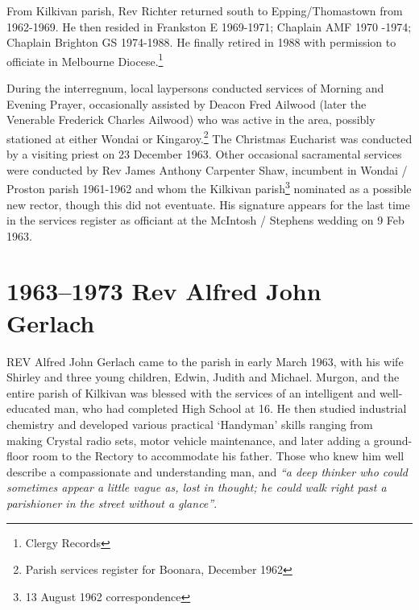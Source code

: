 From Kilkivan parish, Rev Richter returned south to Epping/Thomastown from 1962-1969. He then resided in Frankston E 1969-1971; Chaplain AMF 1970 -1974; Chaplain Brighton GS 1974-1988. He finally retired in 1988 with permission to officiate in Melbourne Diocese.\footnote{Clergy Records}


During the interregnum, local laypersons conducted services of Morning and Evening Prayer, occasionally assisted by Deacon Fred Ailwood (later the Venerable Frederick Charles Ailwood) who was active in the area, possibly stationed at either Wondai or Kingaroy.\footnote{Parish services register for Boonara, December 1962} The Christmas Eucharist was conducted by a visiting priest on 23 December 1963. Other occasional sacramental services were conducted by Rev James Anthony Carpenter Shaw, incumbent in Wondai / Proston parish 1961-1962 and whom the Kilkivan parish\footnote{13 August 1962 correspondence} nominated as a possible new rector, though this did not eventuate. His signature appears for the last time in the services register as officiant at the McIntosh / Stephens wedding on 9 Feb 1963.


\balance


\printendnotes[custom]
\setcounter{endnote}{0}




\chapter{1963--1973 Rev Alfred John Gerlach}
\nobalance


\lettrine[lines=3]{R}{EV}
 Alfred John Gerlach came to the parish in early March 1963, with his wife Shirley and three young children, Edwin, Judith and Michael. Murgon, and the entire parish of Kilkivan was blessed with the services of an intelligent and well-educated man, who had completed High School at 16. He then studied industrial chemistry and developed various practical `Handyman' skills ranging from making Crystal radio sets, motor vehicle maintenance, and later adding a ground-floor room to the Rectory to accommodate his father. Those who knew him well describe a compassionate and understanding man, and \emph{``a deep thinker who could sometimes appear a little vague as, lost in thought; he could walk right past a parishioner in the street without a glance''}.







